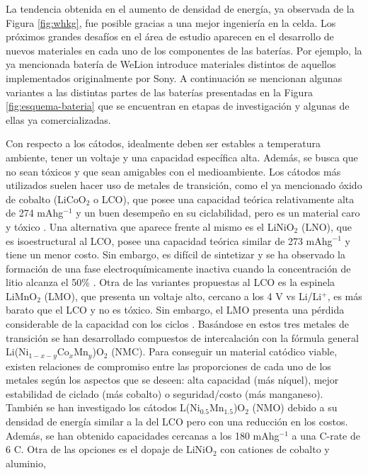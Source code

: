 La tendencia obtenida en el aumento de densidad de energía, ya observada de la 
Figura \ref{fig:whkg}, fue posible gracias a una mejor ingeniería en la celda. 
Los próximos grandes desafíos en el área de estudio aparecen en el desarrollo de 
nuevos materiales en cada uno de los componentes de las baterías.
Por ejemplo, la ya mencionada batería de WeLion introduce materiales distintos 
de aquellos implementados originalmente por Sony. A continuación se mencionan
algunas variantes a las distintas partes de las baterías presentadas en la
Figura \ref{fig:esquema-bateria} que se encuentran en etapas de investigación 
y algunas de ellas ya comercializadas.

Con respecto a los cátodos, idealmente deben ser estables a temperatura ambiente,
tener un voltaje y una capacidad específica alta. Además, se busca que no sean 
tóxicos y que sean amigables con el medioambiente. Los cátodos más utilizados 
suelen hacer uso de metales de transición, como el ya mencionado óxido de cobalto 
(LiCoO$_2$ o LCO), que posee una capacidad teórica relativamente alta de 274 mAhg$^{-1}$ y un buen desempeño en su ciclabilidad, pero es un
material caro y tóxico \cite{akhilash2021}. Una alternativa que aparece frente
al mismo es el LiNiO$_2$ (LNO), que es isoestructural al LCO, posee una
capacidad teórica similar de 273 mAhg$^{-1}$ y tiene un menor costo. Sin embargo, es
difícil de sintetizar y se ha observado la formación de una fase 
electroquímicamente inactiva cuando la concentración de litio alcanza el 50\% 
\cite{bianchini2019}. Otra de las variantes propuestas al LCO es la espinela
LiMnO$_2$ (LMO), que presenta un voltaje alto, cercano a los 4 V vs Li/Li$^+$,
es más barato que el LCO y no es tóxico. Sin embargo, el LMO presenta una 
pérdida considerable de la capacidad con los ciclos \cite{bhandari2016}. Basándose en estos 
tres metales de transición se han desarrollado compuestos de intercalación con 
la fórmula general Li(Ni$_{1-x-y}$Co$_x$Mn$_y$)O$_2$ (NMC). Para conseguir un 
material catódico viable, existen relaciones de compromiso entre las proporciones de cada uno de 
los metales según los aspectos que se deseen: alta capacidad (más níquel), 
mejor estabilidad de ciclado (más cobalto) o seguridad/costo (más manganeso). 
También se han investigado los cátodos L(Ni$_{0.5}$Mn$_{1.5}$)O$_2$ (NMO) debido
a su densidad de energía similar a la del LCO pero con una reducción en los costos.
Además, se han obtenido capacidades cercanas a los 180 mAhg$^{-1}$ a una C-rate de 6 C.
Otra de las opciones es el dopaje de LiNiO$_2$ con cationes de cobalto y aluminio, 

